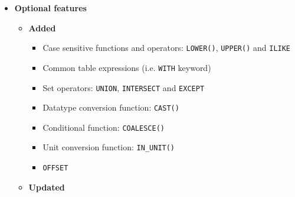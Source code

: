 \documentclass[11pt,a4paper]{ivoa}
\begin{document}
\begin{itemize}
\begin{itemize}
\begin{itemize}
                    \item Description of SQL-92 with links/URLs
                    \item BNF grammar syntax fixes
                          (see )
                    \item \verb:ORDER BY: accepts qualified column names (i.e.
                          prefixed by a table name eventually prefixed by a
                          schema name)
                          (see )
                    \item \verb:ORDER BY: accepts expressions
                    (see )
                \end{itemize}
        \end{itemize}
    \item \textbf{Optional features}
        \begin{itemize}
            \item \textbf{Added}
                \begin{itemize}
                    \item Case sensitive functions and operators:
                          \verb:LOWER():, \verb:UPPER():
                          and \verb:ILIKE:
                    \item Common table expressions (i.e. \verb:WITH: keyword)
                    \item Set operators: \verb:UNION:, \verb:INTERSECT: and
                          \verb:EXCEPT: 
                    \item Datatype conversion function: \verb:CAST():
                    \item Conditional function: \verb:COALESCE():
                    \item Unit conversion function: \verb:IN_UNIT():
                    \item \verb:OFFSET:
                \end{itemize}
            \item \textbf{Updated}

\end{itemize}
\end{itemize}
\end{document}
